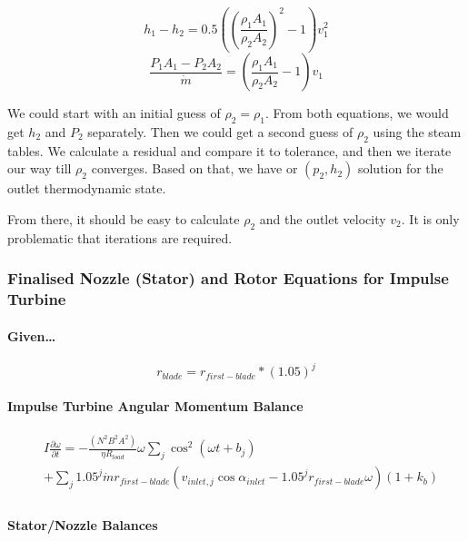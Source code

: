 \documentclass[masters]{ucbthesis}
\renewcommand{\_}{\kern-1.5pt\textunderscore\kern-1.5pt}
\begin{document}
\begin{equation*}
	h_1 - h_2 = 
	0.5 \left( \left(
			\frac{\rho_1 A_1 }{\rho_2 A_2 } 
		\right)^2
	- 1 \right) v_1^2 
\end{equation*}
\begin{equation*}
	\frac{P_1 A_1 - P_2 A_2}{\dot{m}} =  \left( 
		\frac{\rho_1 A_1 }{\rho_2  A_2} - 1
	\right)
	v_1
\end{equation*}

We could start with an initial guess of $\rho_2 = \rho_1$. From both 
equations, we would get $h_2$ and $P_2$ separately. Then we could get 
a second guess of $\rho_2$ using the steam tables. We calculate a residual 
and compare it to tolerance, and then we iterate our way till 
$\rho_2$ converges. Based on that, we have or $(p_2,h_2)$ solution for 
the outlet thermodynamic state.

From there, it should be easy to calculate $\rho_2$ and the outlet 
velocity $v_2$. It is only problematic that iterations are required.

\subsubsection{Finalised Nozzle (Stator) and Rotor Equations for Impulse Turbine}

\paragraph{Given\dots}
\begin{equation*}
	r_{blade} = r_{first-blade} * (1.05)^j
\end{equation*}

\paragraph{Impulse Turbine Angular Momentum Balance}
\begin{align*}
	& I \frac{\partial  \omega}{\partial t} = 
	- \frac{( N^2 B^2 A^2 )}{\eta R_{load} }\omega 
	\sum_j \cos^2 (\omega t + b_j)  \\ &
	+ 
	\sum_j 1.05^j \dot{m}  r_{first-blade} 
	(v_{inlet,j} \cos \alpha_{inlet} - 1.05^j r_{first-blade}  \omega) (1+ k_b)
	\\
\end{align*}

\paragraph{Stator/Nozzle Balances}
\end{document}
